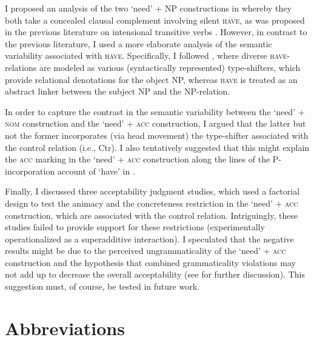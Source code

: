\documentclass[output=paper,colorlinks,citecolor=brown]{langscibook}
\begin{document}
I proposed an analysis of the two `need' + NP constructions in  whereby they both take a concealed clausal complement involving silent \textsc{have}, as was proposed in the previous literature on intensional transitive verbs \citep[e.g.,][]{Harves2008}. However, in contrast to the previous literature, I used a more elaborate analysis of the semantic variability associated with \textsc{have}. Specifically, I followed \citet{Zaroukian.Beller2013}, where diverse \textsc{have}-relations are modeled as various (syntactically represented) type-shifters, which provide relational denotations for the object NP, whereas \textsc{have} is treated as an abstract linker between the subject NP and the NP-relation.

In order to capture the contrast in the semantic variability between the `need' + \textsc{nom} construction and the `need' + \textsc{acc} construction, I argued that the latter but not the former incorporates (via head movement) the type-shifter associated with the control relation (i.e., Ctr). I also tentatively suggested that this might explain the \textsc{acc} marking in the `need' + \textsc{acc} construction along the lines of the P-incorporation account of `have' in \citet{Freeze1992} \citep[see also][]{Kayne1993}.

    \largerpage %

Finally, I discussed three acceptability judgment studies, which used a factorial design to test the animacy and the concreteness restriction in the `need' + \textsc{acc} construction, which are associated with the control relation. Intriguingly, these studies failed to provide support for these restrictions (experimentally operationalized as a superadditive interaction). I speculated that the negative results might be due to the perceived ungrammaticality of the `need' + \textsc{acc} construction and the hypothesis that combined grammaticality violations may not add up to decrease the overall acceptability (see \citealt{Hofmeister.Casasanto.Staum.Sag2014} for further discussion). This suggestion must, of course, be tested in future work.

\section*{Abbreviations}
\end{document}
